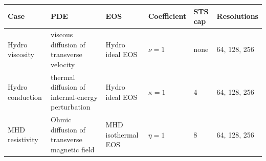 \begin{tabular}{llllll}
\toprule
Case & PDE & EOS & Coefficient & STS cap & Resolutions \\
\midrule
Hydro viscosity & viscous diffusion of transverse velocity & Hydro ideal EOS & $\nu=1$ & none & 64, 128, 256 \\
Hydro conduction & thermal diffusion of internal-energy perturbation & Hydro ideal EOS & $\kappa=1$ & 4 & 64, 128, 256 \\
MHD resistivity & Ohmic diffusion of transverse magnetic field & MHD isothermal EOS & $\eta=1$ & 8 & 64, 128, 256 \\
\bottomrule
\end{tabular}
